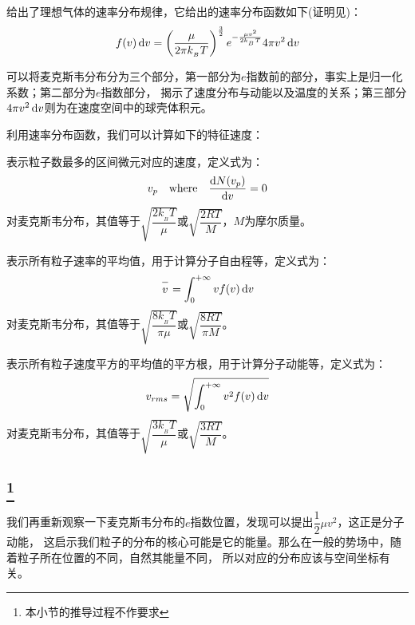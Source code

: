  给出了理想气体的速率分布规律，它给出的速率分布函数如下(证明见)：
\begin{equation}
    f(v)\dif{v}=\left(\dfrac \mu{2\pi k_{_B}T}\right)^{\frac{3}{2}}e^{-\frac{\mu v^{2}}{2k_{_B}T}}4\pi v^2\dif{v}
    \nonumber
\end{equation}

可以将麦克斯韦分布分为三个部分，第一部分为$e$指数前的部分，事实上是归一化系数；第二部分为$e$指数部分，
揭示了速度分布与动能以及温度的关系；第三部分$4\pi v^{2}\dif{v}$则为在速度空间中的球壳体积元。

利用速率分布函数，我们可以计算如下的特征速度：
\begin{Itemize}
    \item {} 表示粒子数最多的区间微元对应的速度，定义式为：
    \begin{equation}
        v_{p} \quad \text{where} \quad \frac{\dif N({v_{p}})}{\dif{v}} = 0
        \nonumber
    \end{equation}
    对麦克斯韦分布，其值等于$\sqrt{\dfrac{2k_{_B}T}{\mu}}$或$\sqrt{\dfrac{2RT}{M}}$，$M$为摩尔质量。
    \item {} 表示所有粒子速率的平均值，用于计算分子自由程等，定义式为：
    \begin{equation}
        \upperline{v} = \int_{0}^{+\infty} vf(v) \dif v
        \nonumber
    \end{equation}
    对麦克斯韦分布，其值等于$\sqrt{\dfrac{8k_{_B}T}{\pi \mu}}$或$\sqrt{\dfrac{8RT}{\pi M}}$。
    \item {} 表示所有粒子速度平方的平均值的平方根，用于计算分子动能等，定义式为：
    \begin{equation}
        v_{rms} = \sqrt{\int_{0}^{+\infty} v^{2}f(v)\dif v}
        \nonumber
    \end{equation}
    对麦克斯韦分布，其值等于$\sqrt{\dfrac{3k_{_B}T}{\mu}}$或$\sqrt{\dfrac{3RT}{M}}$。
\end{Itemize}
\subsection[玻尔兹曼分布]{\footnote{本小节的推导过程不作要求}}
我们再重新观察一下麦克斯韦分布的$e$指数位置，发现可以提出$\dfrac{1}{2}\mu v^{2}$，这正是分子动能，
这启示我们粒子的分布的核心可能是它的能量。那么在一般的势场中，随着粒子所在位置的不同，自然其能量不同，
所以对应的分布应该与空间坐标有关。

